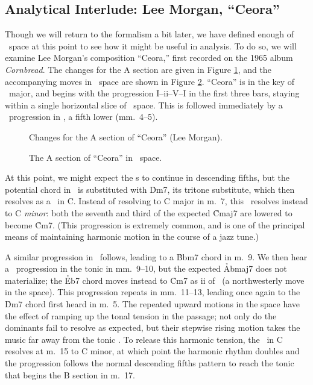 


\FloatBarrier

\subsection{Analytical Interlude: Lee Morgan, “Ceora”}
\label{sec:ceora-analysis}

Though we will return to the formalism a bit later, we have defined enough of
\tf\ space at this point to see how it might be useful in analysis. To do so,
we will examine Lee Morgan's composition ``Ceora,'' first recorded on the 1965
album \emph{Cornbread}. The changes for the A section are given in
Figure \ref{tf:ceora-changes-1}, and the accompanying moves in \tf\ space are
shown in Figure \ref{tf:ceora-space-1}. ``Ceora'' is in the key of
\Aflat\ major, and begins with the progression I--ii--V--I in the first three
bars, staying within a single horizontal slice of \tf\ space. This is followed
immediately by a \tfo\ progression in \Dflat, a fifth lower (mm.~4--5).

\begin{figure}[p]
  \caption{Changes for the A section of ``Ceora'' (Lee Morgan).}
  \label{tf:ceora-changes-1}
\end{figure}

\begin{figure}[p]
  \caption{The A section of ``Ceora'' in \tf\ space.}
  \label{tf:ceora-space-1}
\end{figure}

At this point, we might expect the \tf{}s to continue in descending
fifths, but the potential \ii chord in \Gflat\ is substituted with
\h{Dm7}, its tritone substitute, which then resolves as a \tf\ in C.
Instead of resolving to C major in m.~7, this \tf\ resolves instead to C
\emph{minor}: both the seventh and third of the expected \h{Cmaj7} are lowered
to become \h{Cm7}. (This progression is extremely common, and is one of the
principal means of maintaining harmonic motion in the course of a jazz tune.)

A similar progression in \Bflat\ follows, leading to a \h{Bbm7} chord in m.~9.
We then hear a \tf\ progression in the tonic in mm.~9--10, but the
expected \h{Abmaj7} does not materialize; the \h{Eb7} chord moves instead to
\h{Cm7} as ii of \Bflat\ (a northwesterly move in the space). This
progression repeats in mm.~11--13, leading once again to the \h{Dm7} chord
first heard in m.~5. The repeated upward motions in the space have the
effect of ramping up the tonal tension in the passage; not only do the
dominants fail to resolve as expected, but their stepwise rising motion takes
the music far away from the tonic \Aflat. To release this harmonic tension,
the \tf\ in C resolves at m.~15 to C minor, at which point the harmonic rhythm
doubles and the progression follows the normal descending fifths pattern to
reach the tonic that begins the B section in m.~17.

